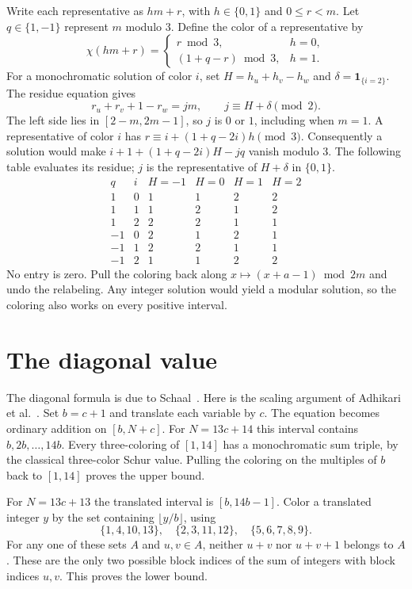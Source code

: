 \documentclass[11pt]{article}
\begin{document}
Write each representative as $hm+r$, with $h\in\{0,1\}$ and $0\leq r<m$.
Let $q\in\{1,-1\}$ represent $m$ modulo $3$. Define the color of a representative by
\[
 \chi(hm+r)=
 \begin{cases}r\bmod 3,&h=0,\\ (1+q-r)\bmod 3,&h=1.\end{cases}
\]
For a monochromatic solution of color $i$, set $H=h_u+h_v-h_w$ and
$\delta=\mathbf 1_{\{i=2\}}$. The residue equation gives
\[
 r_u+r_v+1-r_w=jm,\qquad j\equiv H+\delta\pmod 2.
\]
The left side lies in $[2-m,2m-1]$, so $j$ is $0$ or $1$, including when $m=1$.
A representative of color $i$ has $r\equiv i+(1+q-2i)h\pmod3$.
Consequently a solution would make $i+1+(1+q-2i)H-jq$ vanish modulo $3$.
The following table evaluates its residue; $j$ is the representative of
$H+\delta$ in $\{0,1\}$.
\[
\begin{array}{cc|rrrr}
 q&i&H=-1&H=0&H=1&H=2\\ \hline
 1&0&1&1&2&2\\
 1&1&1&2&1&2\\
 1&2&2&2&1&1\\
 -1&0&2&1&2&1\\
 -1&1&2&2&1&1\\
 -1&2&1&1&2&2
\end{array}
\]
No entry is zero. Pull the coloring back along $x\mapsto (x+a-1)\bmod 2m$
and undo the relabeling. Any integer solution would yield a modular solution,
so the coloring also works on every positive interval.

\section{The diagonal value}
The diagonal formula is due to Schaal~\cite{schaal}. Here is the scaling
argument of Adhikari et al.~\cite[Proposition 4.9 and Corollary 4.10]{adhikari}.
Set $b=c+1$ and translate each variable by $c$. The equation becomes
ordinary addition on $[b,N+c]$. For $N=13c+14$ this interval contains
$b,2b,\ldots,14b$. Every three-coloring of $[1,14]$ has a monochromatic
sum triple, by the classical three-color Schur value. Pulling the coloring
on the multiples of $b$ back to $[1,14]$ proves the upper bound.

For $N=13c+13$ the translated interval is $[b,14b-1]$. Color a translated
integer $y$ by the set containing $\lfloor y/b\rfloor$, using
\[
 \{1,4,10,13\},\quad \{2,3,11,12\},\quad \{5,6,7,8,9\}.
\]
For any one of these sets $A$ and $u,v\in A$, neither $u+v$ nor $u+v+1$
belongs to $A$. These are the only two possible block indices of the sum
of integers with block indices $u,v$. This proves the lower bound.
\end{document}

